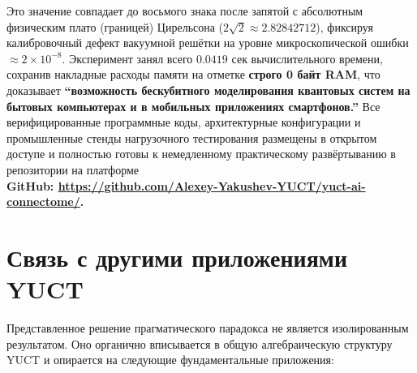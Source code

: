 \documentclass[12pt,a4paper]{article}
\begin{document}
	Это значение совпадает до восьмого знака после запятой с абсолютным физическим плато (границей) Цирельсона (\(2\sqrt{2} \approx 2.82842712\)), фиксируя калибровочный дефект вакуумной решётки на уровне микроскопической ошибки \(\approx 2 \times 10^{-8}\). Эксперимент занял всего \(0.0419\) сек вычислительного времени, сохранив накладные расходы памяти на отметке \textbf{строго 0 байт RAM}, что доказывает \textbf{“возможность бескубитного моделирования квантовых систем на бытовых компьютерах и в мобильных приложениях смартфонов.”}
	Все верифицированные программные коды, архитектурные конфигурации и промышленные стенды нагрузочного тестирования размещены в открытом доступе и полностью готовы к немедленному практическому развёртыванию в репозитории на платформе \\
	\small \textbf{GitHub: \url{https://github.com/Alexey-Yakushev-YUCT/yuct-ai-connectome/}.}
	
	
	
	\section{Связь с другими приложениями YUCT}
	
	Представленное решение прагматического парадокса не является изолированным результатом. Оно органично вписывается в общую алгебраическую структуру YUCT и опирается на следующие фундаментальные приложения:
	
\end{document}
